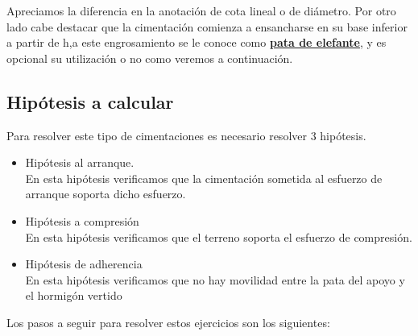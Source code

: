 \documentclass{article}
\begin{document}
        Apreciamos la diferencia en la anotación de cota lineal o de diámetro. Por otro lado cabe destacar que la cimentación comienza a ensancharse en su base inferior a partir de h,a este engrosamiento se le conoce como \textbf{\underline{pata de elefante}}, y es opcional su utilización o no como veremos a continuación.
    
    \newpage
    \subsection{Hipótesis a calcular}
        Para resolver este tipo de cimentaciones es necesario resolver 3 hipótesis.
        \begin{itemize}
            \item Hipótesis al arranque.\\
                En esta hipótesis verificamos que la cimentación sometida al esfuerzo de arranque soporta dicho esfuerzo.
            \item Hipótesis a compresión \\
                En esta hipótesis verificamos que el terreno soporta el esfuerzo de compresión.
            \item Hipótesis de adherencia \\
                En esta hipótesis verificamos que no hay movilidad entre la pata del apoyo y el hormigón vertido
        \end{itemize}

        Los pasos a seguir para resolver estos ejercicios son los siguientes:
        
\end{document}

